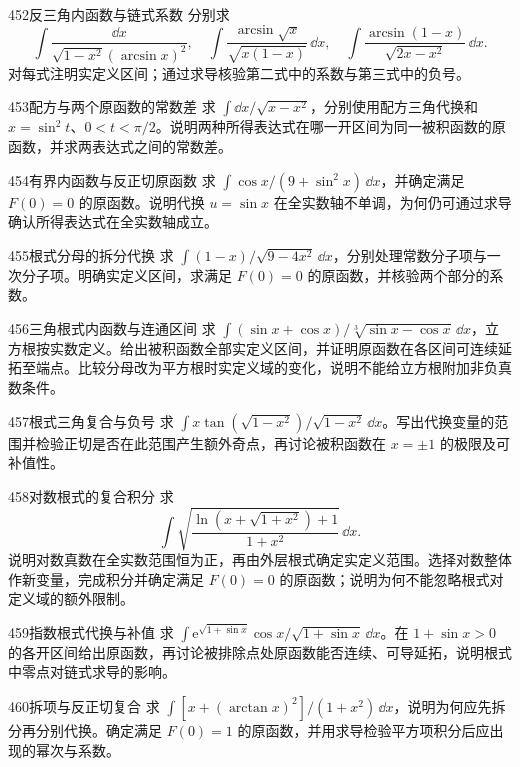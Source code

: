\begin{exercise}{452}{反三角内函数与链式系数}
分别求
\[\int\frac{\dd x}{\sqrt{1-x^2}(\arcsin x)^2},\quad \int\frac{\arcsin\sqrt x}{\sqrt{x(1-x)}}\,\dd x,\quad \int\frac{\arcsin(1-x)}{\sqrt{2x-x^2}}\,\dd x.\]
对每式注明实定义区间；通过求导核验第二式中的系数与第三式中的负号。
\end{exercise}
\begin{exercise}{453}{配方与两个原函数的常数差}
求 $\int\dd x/\sqrt{x-x^2}$，分别使用配方三角代换和 $x=\sin^2t$、$0<t<\pi/2$。说明两种所得表达式在哪一开区间为同一被积函数的原函数，并求两表达式之间的常数差。
\end{exercise}
\begin{exercise}{454}{有界内函数与反正切原函数}
求 $\int\cos x/(9+\sin^2x)\,\dd x$，并确定满足 $F(0)=0$ 的原函数。说明代换 $u=\sin x$ 在全实数轴不单调，为何仍可通过求导确认所得表达式在全实数轴成立。
\end{exercise}
\begin{exercise}{455}{根式分母的拆分代换}
求 $\int(1-x)/\sqrt{9-4x^2}\,\dd x$，分别处理常数分子项与一次分子项。明确实定义区间，求满足 $F(0)=0$ 的原函数，并核验两个部分的系数。
\end{exercise}
\begin{exercise}{456}{三角根式内函数与连通区间}
求 $\int(\sin x+\cos x)/\sqrt[3]{\sin x-\cos x}\,\dd x$，立方根按实数定义。给出被积函数全部实定义区间，并证明原函数在各区间可连续延拓至端点。比较分母改为平方根时实定义域的变化，说明不能给立方根附加非负真数条件。
\end{exercise}
\begin{exercise}{457}{根式三角复合与负号}
求 $\int x\tan(\sqrt{1-x^2})/\sqrt{1-x^2}\,\dd x$。写出代换变量的范围并检验正切是否在此范围产生额外奇点，再讨论被积函数在 $x=\pm1$ 的极限及可补值性。
\end{exercise}
\begin{exercise}{458}{对数根式的复合积分}
求
\[\int\sqrt{\frac{\ln(x+\sqrt{1+x^2})+1}{1+x^2}}\,\dd x.\]
说明对数真数在全实数范围恒为正，再由外层根式确定实定义范围。选择对数整体作新变量，完成积分并确定满足 $F(0)=0$ 的原函数；说明为何不能忽略根式对定义域的额外限制。
\end{exercise}
\begin{exercise}{459}{指数根式代换与补值}
求 $\int\mathrm e^{\sqrt{1+\sin x}}\cos x/\sqrt{1+\sin x}\,\dd x$。在 $1+\sin x>0$ 的各开区间给出原函数，再讨论被排除点处原函数能否连续、可导延拓，说明根式中零点对链式求导的影响。
\end{exercise}
\begin{exercise}{460}{拆项与反正切复合}
求 $\int[x+(\arctan x)^2]/(1+x^2)\,\dd x$，说明为何应先拆分再分别代换。确定满足 $F(0)=1$ 的原函数，并用求导检验平方项积分后应出现的幂次与系数。
\end{exercise}
